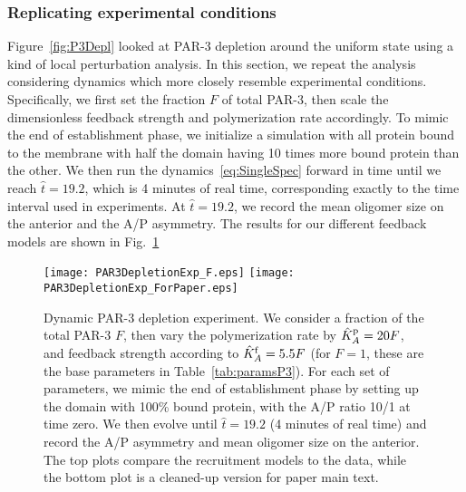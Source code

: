 \documentclass[11pt]{article}
\newcommand{\6}[1]{#1_{\text{6}}}
\newcommand{\3}[1]{#1_{\text{3}}}
\begin{document}
\subsubsection{Replicating experimental conditions}
Figure\ \ref{fig:P3Depl} looked at PAR-3 depletion around the uniform state using a kind of local perturbation analysis. In this section, we repeat the analysis considering dynamics which more closely resemble experimental conditions. Specifically, we first set the fraction $F$ of total PAR-3, then scale the dimensionless feedback strength and polymerization rate accordingly. To mimic the end of establishment phase, we initialize a simulation with all protein bound to the membrane with half the domain having 10 times more bound protein than the other. We then run the dynamics\ \eqref{eq:SingleSpec} forward in time until we reach $\hat t = 19.2$, which is 4 minutes of real time, corresponding exactly to the time interval used in experiments. At $\hat t = 19.2$, we record the mean oligomer size on the anterior and the A/P asymmetry. The results for our different feedback models are shown in Fig.\ \ref{fig:P3DeplF}

\begin{figure}
\centering
\texttt{[image: PAR3DepletionExp\_F.eps]}
\texttt{[image: PAR3DepletionExp\_ForPaper.eps]}
\caption{\label{fig:P3DeplF}Dynamic PAR-3 depletion experiment. We consider a fraction of the total PAR-3 $F$, then vary the polymerization rate by $\hat{K}^\text{p}_A=20F$, and feedback strength according to $\hat{K}^\text{f}_A=5.5F$ (for $F=1$, these are the base parameters in Table\ \ref{tab:paramsP3}). For each set of parameters, we mimic the end of establishment phase by setting up the domain with 100\% bound protein, with the A/P ratio 10/1  at time zero. We then evolve until $\hat t=19.2$ (4 minutes of real time) and record the A/P asymmetry and mean oligomer size on the anterior. The top plots compare the recruitment models to the data, while the bottom plot is a cleaned-up version for paper main text. }
\end{figure}
\end{document}
